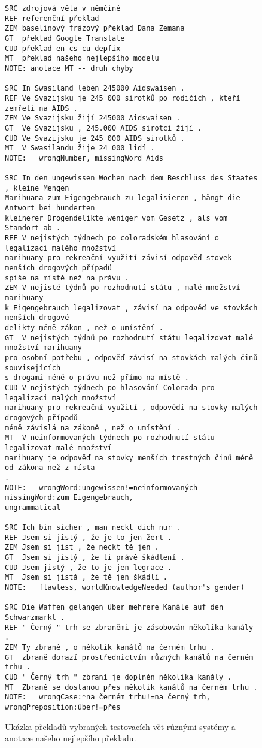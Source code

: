 \documentclass[a4]{article}
\begin{document}
\begin{figure}[t]
\centering
\begin{verbatim}
SRC	zdrojová věta v němčině
REF referenční překlad
ZEM	baselinový frázový překlad Dana Zemana
GT	překlad Google Translate  
CUD překlad en-cs cu-depfix
MT	překlad našeho nejlepšího modelu
NOTE: anotace MT -- druh chyby

SRC In Swasiland leben 245000 Aidswaisen .
REF Ve Svazijsku je 245 000 sirotků po rodičích , kteří zemřeli na AIDS .
ZEM Ve Svazijsku žijí 245000 Aidswaisen .
GT  Ve Svazijsku , 245.000 AIDS sirotci žijí .
CUD Ve Svazijsku je 245 000 AIDS sirotků .
MT  V Swasilandu žije 24 000 lidí .
NOTE:   wrongNumber, missingWord Aids

SRC	In den ungewissen Wochen nach dem Beschluss des Staates , kleine Mengen
Marihuana zum Eigengebrauch zu legalisieren , hängt die Antwort bei hunderten
kleinerer Drogendelikte weniger vom Gesetz , als vom Standort ab .
REF	V nejistých týdnech po coloradském hlasování o legalizaci malého množství
marihuany pro rekreační využití závisí odpověď stovek menších drogových případů
spíše na místě než na právu .
ZEM	V nejisté týdnů po rozhodnutí státu , malé množství marihuany
k Eigengebrauch legalizovat , závisí na odpověď ve stovkách menších drogové
delikty méně zákon , než o umístění .
GT	V nejistých týdnů po rozhodnutí státu legalizovat malé množství marihuany
pro osobní potřebu , odpověď závisí na stovkách malých činů souvisejících
s drogami méně o právu než přímo na místě .
CUD	V nejistých týdnech po hlasování Colorada pro legalizaci malých množství
marihuany pro rekreační využití , odpovědi na stovky malých drogových případů
méně závislá na zákoně , než o umístění .
MT	V neinformovaných týdnech po rozhodnutí státu legalizovat malé množství
marihuany je odpověď na stovky menších trestných činů méně od zákona než z místa
.
NOTE:	wrongWord:ungewissen!=neinformovaných missingWord:zum Eigengebrauch,
ungrammatical

SRC	Ich bin sicher , man neckt dich nur .
REF	Jsem si jistý , že je to jen žert .
ZEM	Jsem si jist , že neckt tě jen .
GT	Jsem si jistý , že ti právě škádlení .
CUD	Jsem jistý , že to je jen legrace .
MT	Jsem si jistá , že tě jen škádlí .
NOTE:	flawless, worldKnowledgeNeeded (author's gender)

SRC	Die Waffen gelangen über mehrere Kanäle auf den Schwarzmarkt .
REF	" Černý " trh se zbraněmi je zásobován několika kanály .
ZEM	Ty zbraně , o několik kanálů na černém trhu .
GT	zbraně dorazí prostřednictvím různých kanálů na černém trhu .
CUD	" Černý trh " zbraní je doplněn několika kanály .
MT	Zbraně se dostanou přes několik kanálů na černém trhu .
NOTE:	wrongCase:*na černém trhu!=na černý trh, wrongPreposition:über!=přes
\end{verbatim}
\caption{Ukázka překladů vybraných testovacích vět různými systémy a anotace našeho nejlepšího překladu.}
\label{fig:preklad}
\end{figure}
\end{document}
